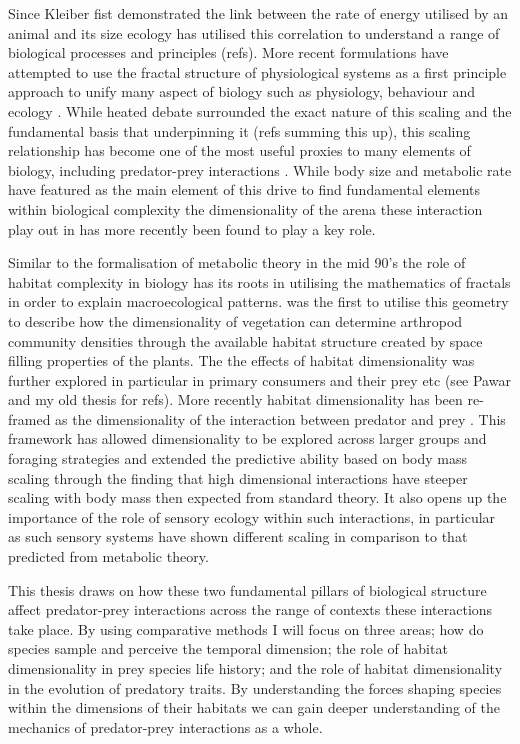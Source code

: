 Since Kleiber fist demonstrated the link between the rate of energy utilised by an animal and its size \citep{kleiber1947body} ecology has utilised this correlation to understand a range of biological processes and principles (refs). More recent formulations have attempted to use the fractal structure of physiological systems as a first principle approach to unify many aspect of biology such as physiology, behaviour and ecology \citep{west1997general,brown2004}. While heated debate surrounded the exact nature of this scaling and the fundamental basis that underpinning it (refs summing this up), this scaling relationship has become one of the most useful proxies to many elements of biology, including predator-prey interactions \citep{brown2004}. While body size and metabolic rate have featured as the main element of this drive to find fundamental elements within biological complexity the dimensionality of the arena these interaction play out in has more recently been found to play a key role.


Similar to the formalisation of metabolic theory in the mid 90's the role of habitat complexity in biology has its roots in utilising the mathematics of fractals in order to explain macroecological patterns. \cite{morse1985fractal} was the first to utilise this geometry to describe how the dimensionality of vegetation can determine arthropod community densities through the available habitat structure created by space filling properties of the plants. The the effects of habitat dimensionality was further explored in particular in primary consumers and their prey etc (see Pawar and my old thesis for refs). More recently habitat dimensionality has been re-framed as the dimensionality of the interaction between predator and prey \citep{pawar2012dimensionality}. This framework has allowed dimensionality to be explored across larger groups and foraging strategies and extended the predictive ability based on body mass scaling through the finding that high dimensional interactions have steeper scaling with body mass then expected from standard theory. It also opens up the importance of the role of sensory ecology within such interactions, in particular as such sensory systems have shown different scaling in comparison to that predicted from metabolic theory. %


This thesis draws on how these two fundamental pillars of biological structure affect predator-prey interactions across the range of contexts these interactions take place. By using comparative methods I will focus on three areas; how do species sample and perceive the temporal dimension; the role of habitat dimensionality in prey species life history; and the role of habitat dimensionality in the evolution of predatory traits. By understanding the forces shaping species within the dimensions of their habitats we can gain deeper understanding of the mechanics of predator-prey interactions as a whole.


